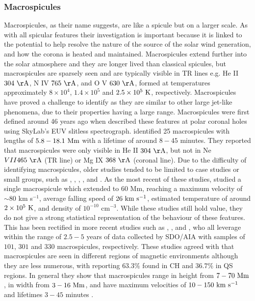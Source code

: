 \subsubsection{Macrospicules}
\label{subsec:Mspic}
Macrospicules, as their name suggests, are like a spicule but on a larger scale. As with all spicular features their investigation is important because it is linked to the potential to help resolve the nature of the source of the solar wind generation, and how the corona is heated and maintained. Macrospicules extend further into the solar atmosphere and they are longer lived than classical spicules, but macrospicules are sparsely seen and are typically visible in TR lines e.g. He II $304~\rm{\AA}$, N IV $765~\rm{\AA}$, and O V $630~\rm{\AA}$, formed at temperatures approximately $8\times10^4$, $1.4\times10^5$ and $2.5\times10^5~\rm{K}$, respectively. Macrospicules have proved a challenge to identify as they are similar to other large jet-like phenomena, due to their properties having a large range. Macrospicules were first defined around 46 years ago when \cite{Bohlin1975ApJ197L133B} described these features at polar coronal holes using SkyLab's EUV slitless spectrograph. \cite{Bohlin1975ApJ197L133B} identified 25 macrospicules with lengths of $5.8-18.1~\rm{Mm}$ with a lifetime of around $8-45$ minutes. They reported that macrospicules were only visible in He II $304~\rm{\AA}$, but not in Ne $VII 465~\rm{\AA}$ (TR line) or Mg IX $368~\rm{\AA}$ (coronal line). \np
%
Due to the difficulty of identifying macrospicules, older studies tended to be limited to case studies or small groups, such as \cite{Moe1975SoPh4065K}, \cite{Bohlin1975ApJ197L133B}, \cite{Labonte1979SoPh61283L}, \cite{Pike1997SoPh175457P,Pike1998SoPh182333P}, and \cite{Parenti2002AA384303P}. As the most recent of these studies, \cite{Parenti2002AA384303P} studied a single macrospicule which extended to $60$ Mm, reaching a maximum velocity of $\sim 80$ km s$^{-1}$, average falling speed of $26~\rm{km ~s^{-1}}$, estimated temperature of around $2\times10^5~\rm{K}$, and density of $10^{-10}$ cm$^{-3}$. While these studies still hold value, they do not give a strong statistical representation of the behaviour of these features. This has been rectified in more recent studies such as \cite{Bennett2015ApJ808135B}, \cite{Kiss2017ApJ83547K}, and \cite{Loboda2019ApJ871230L}, who all leverage within the range of $2.5-5$ years of data collected by SDO/AIA with samples of $101$,
$301$ and $330$ macrospicules, respectively. These studies agreed with \cite{Wang1998ApJ509461W} that macrospicules are seen in different regions of magnetic environments although they are less numerous, with \cite{Loboda2019ApJ871230L} reporting $63.3\%$ found in CH and $36.7\%$ in QS regions. In general they show that macrospicules range in height from $7- 70~\rm{Mm}$, in width from $3-16~\rm{Mm}$, and have maximum velocities of $10-150~\rm{km ~s^{-1}}$ and  lifetimes $3-45$ minutes \citep{Bohlin1975ApJ197L133B, Withbroe1976ApJ, Karovska1994ApJ, Parenti2002AA384303P, Bennett2015ApJ808135B, Kiss2017ApJ83547K, Loboda2019ApJ871230L}. \np

